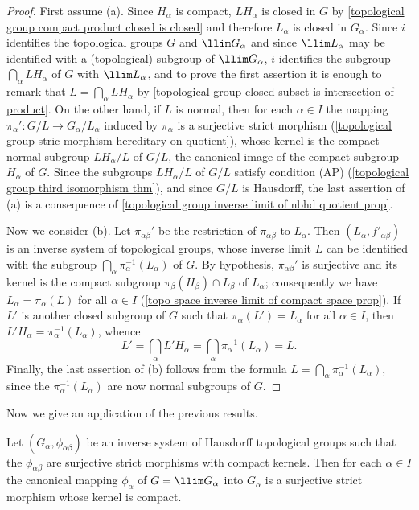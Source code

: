 \begin{proof}
First assume (a). Since $H_\alpha$ is compact, $LH_\alpha$ is closed in $G$ by \cref{topological group compact product closed is closed} and therefore $L_\alpha$ is closed in $G_\alpha$. Since $i$ identifies the topological groups $G$ and $\llim G_\alpha$ and since $\llim L_\alpha$ may be identified with a (topological) subgroup of $\llim G_\alpha$, $i$ identifies the subgroup $\bigcap_\alpha LH_\alpha$ of $G$ with $\llim L_\alpha$, and to prove the first assertion it is enough to remark that $L=\bigcap_\alpha LH_\alpha$ by \cref{topological group closed subset is intersection of product}. On the other hand, if $L$ is normal, then for each $\alpha\in I$ the mapping $\pi_\alpha':G/L\to G_\alpha/L_\alpha$ induced by $\pi_\alpha$ is a surjective strict morphism (\cref{topological group stric morphism hereditary on quotient}), whose kernel is the compact normal subgroup $LH_\alpha/L$ of $G/L$, the canonical image of the compact subgroup $H_\alpha$ of $G$. Since the subgroups $LH_\alpha/L$ of $G/L$ satisfy condition (AP) (\cref{topological group third isomorphism thm}), and since $G/L$ is Hausdorff, the last assertion of (a) is a consequence of \cref{topological group inverse limit of nbhd quotient prop}.\par
Now we consider (b). Let $\pi_{\alpha\beta}'$ be the restriction of $\pi_{\alpha\beta}$ to $L_\alpha$. Then $(L_\alpha,f'_{\alpha\beta})$ is an inverse system of topological groups, whose inverse limit $L$ can be identified with the subgroup $\bigcap_\alpha\pi_\alpha^{-1}(L_\alpha)$ of $G$. By hypothesis, $\pi_{\alpha\beta}'$ is surjective and its kernel is the compact subgroup $\pi_\beta(H_\beta)\cap L_\beta$ of $L_\alpha$; consequently we have $L_\alpha=\pi_\alpha(L)$ for all $\alpha\in I$ (\cref{topo space inverse limit of compact space prop}). If $L'$ is another closed subgroup of $G$ such that $\pi_\alpha(L')=L_\alpha$ for all $\alpha\in I$, then $L'H_\alpha=\pi_\alpha^{-1}(L_\alpha)$, whence
\[L'=\bigcap_\alpha L'H_\alpha=\bigcap_\alpha\pi_\alpha^{-1}(L_\alpha)=L.\]
Finally, the last assertion of (b) follows from the formula $L=\bigcap_\alpha\pi_\alpha^{-1}(L_\alpha)$, since the $\pi_\alpha^{-1}(L_\alpha)$ are now normal subgroups of $G$.
\end{proof}
Now we give an application of the previous results.
\begin{proposition}\label{topological group inverse limit surjective strict morphism}
Let $(G_\alpha,\phi_{\alpha\beta})$ be an inverse system of Hausdorff topological groups such that the $\phi_{\alpha\beta}$ are surjective strict morphisms with compact kernels. Then for each $\alpha\in I$ the canonical mapping $\phi_\alpha$ of $G=\llim G_\alpha$ into $G_\alpha$ is a surjective strict morphism whose kernel is compact.
\end{proposition}

